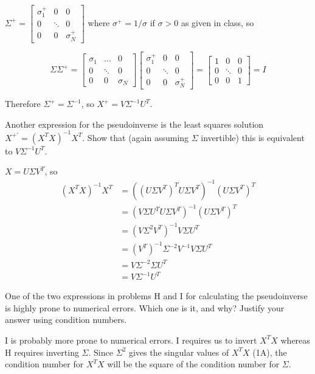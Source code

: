 \begin{solution}
	$\Sigma^+ = \begin{bmatrix} \sigma_1^+ & 0 & 0 \\ 0 & \ddots & 0 \\ 0 & 0 & \sigma_N^+ \end{bmatrix}$ where $\sigma^+ = 1 / \sigma$ if $\sigma > 0$ as given in class, so

	$$
	\Sigma \Sigma^+ =
	\begin{bmatrix}
		\sigma_1 & \dots & 0 \\
		0 & \ddots & 0 \\
		0 & 0 & \sigma_N
	\end{bmatrix}
	\begin{bmatrix}
		\sigma_1^+ & 0 & 0 \\
		0 & \ddots & 0 \\
		0 & 0 & \sigma_N^+
	\end{bmatrix} =
	\begin{bmatrix}
		1 & 0 & 0 \\
		0 & \ddots & 0 \\
		0 & 0 & 1
	\end{bmatrix} =
	I
	$$

	Therefore $\Sigma^+ = \Sigma^{-1}$, so $X^+ = V \Sigma^{-1} U^T$.
\end{solution}

\problem[4] Another expression for the pseudoinverse is the least squares solution $X^{+'} = (X^T X)^{-1}X^T$. Show that (again assuming $\Sigma$ invertible) this is equivalent to $V\Sigma^{-1}U^T$.
\begin{solution}
	$X = U \Sigma V^T$, so
	\begin{align*}
	(X^T X)^{-1} X^T &= \left( (U \Sigma V^T)^T U \Sigma V^T \right)^{-1} (U \Sigma V^T)^T \\
		&= \left( V \Sigma U^T U \Sigma V^T \right)^{-1} (U \Sigma V^T)^T \\
		&= \left( V \Sigma^2 V^T \right)^{-1} V \Sigma U^T \\
		&= (V^T)^{-1} \Sigma^{-2} V^{-1} V \Sigma U^T \\
		&= V \Sigma^{-2} \Sigma U^T \\
		&= V \Sigma^{-1} U^T
	\end{align*}
\end{solution}

\problem[2] One of the two expressions in problems H and I for calculating the pseudoinverse is highly prone to numerical errors. Which one is it, and why? Justify your answer using condition numbers.
\begin{solution}
	I is probably more prone to numerical errors.
	I requires us to invert $X^T X$ whereas H requires inverting $\Sigma$.
	Since $\Sigma^2$ gives the singular values of $X^T X$ (1A), the condition number for $X^T X$ will be the square of the condition number for $\Sigma$.
\end{solution}


